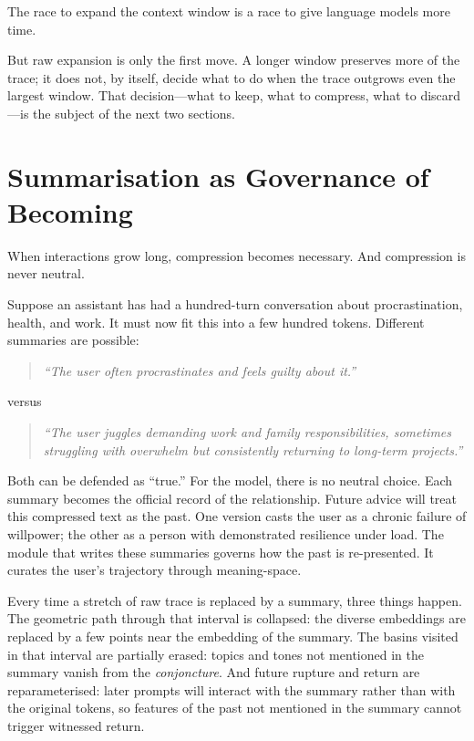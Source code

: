 The race to expand the context window is a race to give language models more time.

But raw expansion is only the first move. A longer window preserves more of the trace; it does not, by itself, decide what to do when the trace outgrows even the largest window. That decision---what to keep, what to compress, what to discard---is the subject of the next two sections.


\section{Summarisation as Governance of Becoming}

When interactions grow long, compression becomes necessary. And compression is never neutral.

Suppose an assistant has had a hundred-turn conversation about procrastination, health, and work. It must now fit this into a few hundred tokens. Different summaries are possible:

\begin{quote}
\emph{``The user often procrastinates and feels guilty about it.''}
\end{quote}

\noindent versus

\begin{quote}
\emph{``The user juggles demanding work and family responsibilities, sometimes struggling with overwhelm but consistently returning to long-term projects.''}
\end{quote}

Both can be defended as ``true.'' For the model, there is no neutral choice. Each summary becomes the official record of the relationship. Future advice will treat this compressed text as the past. One version casts the user as a chronic failure of willpower; the other as a person with demonstrated resilience under load. The module that writes these summaries governs how the past is re-presented. It curates the user's trajectory through meaning-space.

Every time a stretch of raw trace is replaced by a summary, three things happen. The geometric path through that interval is collapsed: the diverse embeddings are replaced by a few points near the embedding of the summary. The basins visited in that interval are partially erased: topics and tones not mentioned in the summary vanish from the \emph{conjoncture}. And future rupture and return are reparameterised: later prompts will interact with the summary rather than with the original tokens, so features of the past not mentioned in the summary cannot trigger witnessed return.

